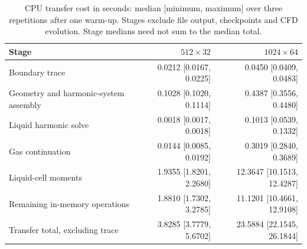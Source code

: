 \begin{table}[tbp]\centering\small
\caption{CPU transfer cost in seconds: median [minimum, maximum] over three repetitions after one warm-up. Stages exclude file output, checkpoints and CFD evolution. Stage medians need not sum to the median total.}\label{tab:transfer-cost}
\begin{tabular}{@{}lrr@{}}\toprule
Stage & $512\times32$ & $1024\times64$\\\midrule
Boundary trace & 0.0212 [0.0167, 0.0225] & 0.0450 [0.0409, 0.0483]\\
Geometry and harmonic-system assembly & 0.1028 [0.1020, 0.1114] & 0.4387 [0.3556, 0.4480]\\
Liquid harmonic solve & 0.0018 [0.0017, 0.0018] & 0.1013 [0.0539, 0.1332]\\
Gas continuation & 0.0144 [0.0085, 0.0192] & 0.3019 [0.2840, 0.3689]\\
Liquid-cell moments & 1.9355 [1.8201, 2.2680] & 12.3647 [10.1513, 12.4287]\\
Remaining in-memory operations & 1.8810 [1.7302, 3.2785] & 11.1201 [10.4661, 12.9108]\\
Transfer total, excluding trace & 3.8285 [3.7779, 5.6702] & 23.5884 [22.1545, 26.1844]\\
\bottomrule\end{tabular}
\end{table}

